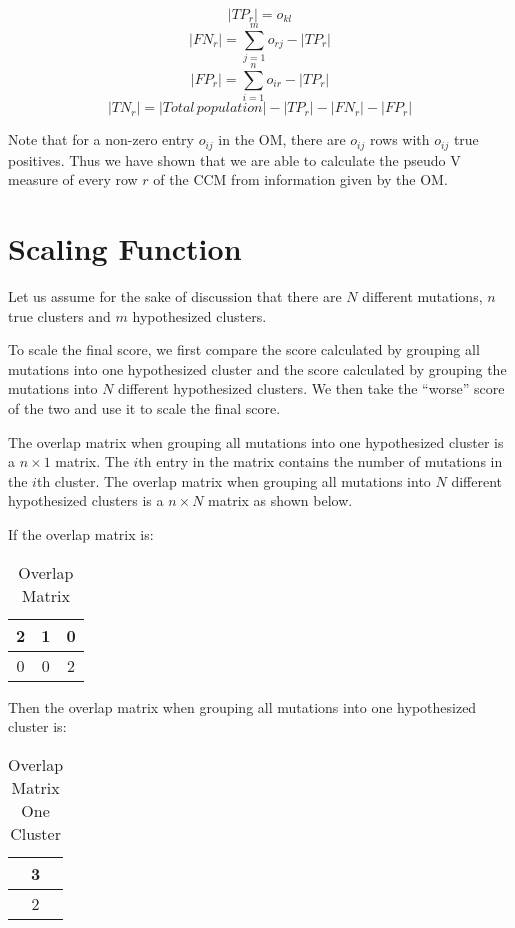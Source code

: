 \documentclass[a4paper, 11pt]{article}
\begin{document}
$$|TP_r| = o_{kl}$$
$$|FN_r| = \sum_{j=1}^{m} o_{rj} - |TP_r|$$
$$|FP_r| = \sum_{i=1}^{n} o_{ir} - |TP_r|$$
$$|TN_r| = |Total\, population| - |TP_r| - |FN_r| - |FP_r|$$

Note that for a non-zero entry $o_{ij}$ in the OM, there are $o_{ij}$ rows with $o_{ij}$ true positives. Thus we have shown that we are able to calculate the pseudo V measure of every row $r$ of the CCM from information given by the OM.

\section*{Scaling Function}
Let us assume for the sake of discussion that there are $N$ different mutations, $n$ true clusters and $m$ hypothesized clusters.

To scale the final score, we first compare the score calculated by grouping all mutations into one hypothesized cluster and the score calculated by grouping the mutations into $N$ different hypothesized clusters. We then take the ``worse'' score of the two and use it to scale the final score.

The overlap matrix when grouping all mutations into one hypothesized cluster is a $ n \times 1 $ matrix. The $i$th entry in the matrix contains the number of mutations in the $i$th cluster. The overlap matrix when grouping all mutations into $N$ different hypothesized clusters is a $ n \times N $ matrix as shown below. 

If the overlap matrix is:
\begin{center}
    \begin{table}[ht]
    \centering
    \begin{tabular}{||c c c||}
    \hline
    2 & 1 & 0\\
    \hline
    0 & 0 & 2\\
    \hline
    \end{tabular}
    \caption{Overlap Matrix}
    \label{table:om}
    \end{table}
\end{center}

Then the overlap matrix when grouping all mutations into one hypothesized cluster is:

\begin{center}
    \begin{table}[ht]
    \centering
    \begin{tabular}{||c||}
    \hline
    3\\
    \hline
    2\\
    \hline
    \end{tabular}
    \caption{Overlap Matrix One Cluster}
    \label{table:om}
    \end{table}
\end{center}
\end{document}
